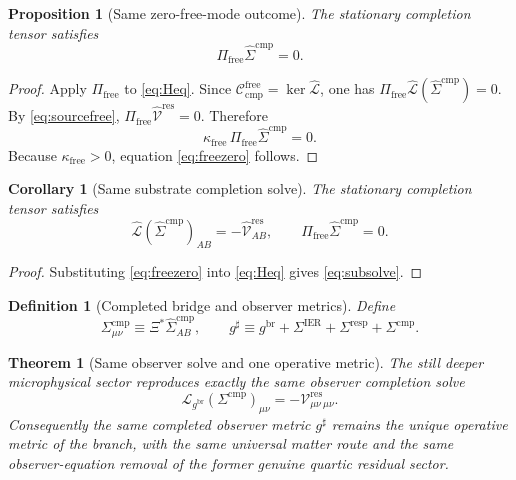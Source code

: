 \documentclass[11pt]{article}
\newcommand{\ObserverMap}{\Xi}
\newcommand{\ObserverMetric}{g^{\mathrm{br}}}
\newcommand{\CompletedMetric}{g^{\sharp}}
\newcommand{\BaseShift}{\Sigma^{\mathrm{IER}}}
\newcommand{\ResponseShift}{\Sigma^{\mathrm{resp}}}
\newcommand{\CompShift}{\Sigma^{\mathrm{cmp}}}
\newcommand{\CompLift}{\widehat\Sigma^{\mathrm{cmp}}}
\newcommand{\ResidualCore}{\mathcal V_{\mu\nu}^{\mathrm{res}}}
\newcommand{\ResidualLift}{\widehat{\mathcal V}^{\mathrm{res}}}
\newcommand{\SubReducedEin}{\widehat{\mathcal L}}
\newcommand{\FreeProj}{\Pi_{\mathrm{free}}}
\newcommand{\ReducedEin}{\mathcal L_{\ObserverMetric}}
\newcommand{\CompFree}{\mathscr C_{\mathrm{cmp}}^{\mathrm{free}}}
\newcommand{\FreeStiff}{\kappa_{\mathrm{free}}}
\newtheorem{definition}{Definition}
\newtheorem{proposition}{Proposition}
\newtheorem{corollary}{Corollary}
\newtheorem{theorem}{Theorem}
\begin{document}
\begin{proposition}[Same zero-free-mode outcome]
\label{prop:freezero}
The stationary completion tensor satisfies
\begin{equation}
\FreeProj\CompLift=0.
\label{eq:freezero}
\end{equation}
\end{proposition}

\begin{proof}
Apply \(\FreeProj\) to \eqref{eq:Heq}. Since \(\CompFree=\ker\SubReducedEin\), one has \(\FreeProj\SubReducedEin(\CompLift)=0\). By \eqref{eq:sourcefree}, \(\FreeProj\ResidualLift=0\). Therefore
\[
\FreeStiff\,\FreeProj\CompLift=0.
\]
Because \(\FreeStiff>0\), equation \eqref{eq:freezero} follows.
\end{proof}

\begin{corollary}[Same substrate completion solve]
\label{cor:subsolve}
The stationary completion tensor satisfies
\begin{equation}
\SubReducedEin(\CompLift)_{AB}
=
-\ResidualLift_{AB},
\qquad
\FreeProj\CompLift=0.
\label{eq:subsolve}
\end{equation}
\end{corollary}

\begin{proof}
Substituting \eqref{eq:freezero} into \eqref{eq:Heq} gives \eqref{eq:subsolve}.
\end{proof}

\begin{definition}[Completed bridge and observer metrics]
\label{def:completed}
Define
\begin{equation}
\CompShift_{\mu\nu}
\equiv
\ObserverMap^*\CompLift_{AB},
\qquad
\CompletedMetric
\equiv
\ObserverMetric+\BaseShift+\ResponseShift+\CompShift.
\label{eq:completedmetric}
\end{equation}
\end{definition}

\begin{theorem}[Same observer solve and one operative metric]
\label{thm:observer}
The still deeper microphysical sector reproduces exactly the same observer completion solve
\begin{equation}
\ReducedEin(\CompShift)_{\mu\nu}
=
-\ResidualCore{}_{\mu\nu}.
\label{eq:observereq}
\end{equation}
Consequently the same completed observer metric \(\CompletedMetric\) remains the unique operative metric of the branch, with the same universal matter route and the same observer-equation removal of the former genuine quartic residual sector.
\end{theorem}
\end{document}
